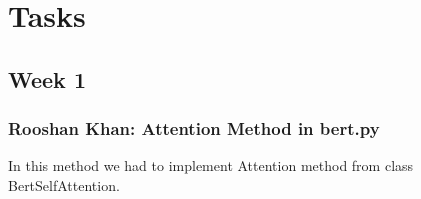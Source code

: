 \documentclass{article}
\begin{document}
\section{Tasks}
\subsection{Week 1}
\subsubsection{Rooshan Khan: Attention Method in bert.py}
In this method we had to implement Attention method from class BertSelfAttention.
\end{document}
